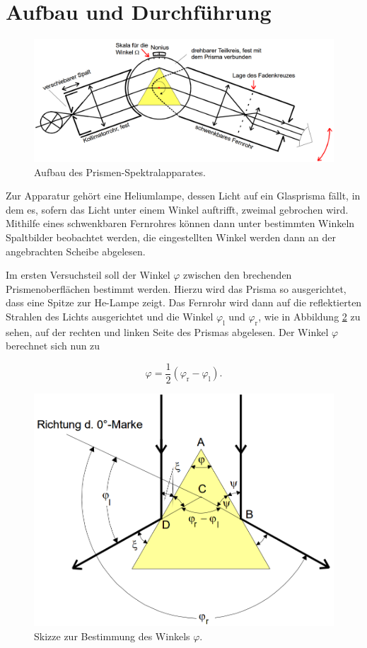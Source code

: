 \section{Aufbau und Durchführung}

\begin{figure}[h!tbp]
	\centering
	\includegraphics[width=0.9\linewidth]{aufbau.png}
	\caption{Aufbau des Prismen-Spektralapparates.\cite[9]{anleitung402}}
	\label{fig:phi}
\end{figure}
Zur Apparatur gehört eine Heliumlampe, dessen Licht auf ein Glasprisma fällt, in dem es, sofern das Licht unter einem Winkel auftrifft, zweimal gebrochen wird. Mithilfe eines schwenkbaren Fernrohres können dann unter bestimmten Winkeln Spaltbilder 
beobachtet werden, die eingestellten Winkel werden dann an der angebrachten Scheibe abgelesen.

Im ersten Versuchsteil soll der Winkel $\varphi$ zwischen den brechenden Prismenoberflächen bestimmt werden. Hierzu wird das Prisma so ausgerichtet, dass eine Spitze zur He-Lampe zeigt. Das Fernrohr wird dann auf die reflektierten Strahlen des Lichts
ausgerichtet und die Winkel $\varphi_{\text{l}}$ und $\varphi_{\text{r}}$, wie in Abbildung \ref{fig:phi} zu sehen, auf der rechten und linken Seite des Prismas abgelesen.
Der Winkel $\varphi$ berechnet sich nun zu

\begin{equation}
\varphi = \frac{1}{2} (\varphi_{\text{r}} - \varphi_{\text{l}}).
\end{equation}


\begin{figure}[h!tbp]
	\centering
	\includegraphics[width=0.7\linewidth]{phi.png}
	\caption{Skizze zur Bestimmung des Winkels $\varphi$.\cite[11]{anleitung402}}
	\label{fig:phi}
\end{figure}


